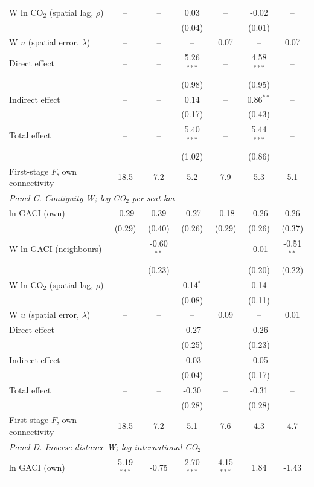 \documentclass[12pt]{article}
\begin{document}
\begin{table}[H]
{\begin{threeparttable}
\begin{tabular}{lcccccc}
  W ln CO$_2$ (spatial lag, $\rho$) & -- & -- & 0.03 & -- & -0.02 & -- \\
   &  &  & (0.04) &  & (0.01) &  \\
  W $u$ (spatial error, $\lambda$) & -- & -- & -- & 0.07 & -- & 0.07 \\
  Direct effect & -- & -- & 5.26$^{***}$ & -- & 4.58$^{***}$ & -- \\
   &  &  & (0.98) &  & (0.95) &  \\
  Indirect effect & -- & -- & 0.14 & -- & 0.86$^{**}$ & -- \\
   &  &  & (0.17) &  & (0.43) &  \\
  Total effect & -- & -- & 5.40$^{***}$ & -- & 5.44$^{***}$ & -- \\
   &  &  & (1.02) &  & (0.86) &  \\
  First-stage $F$, own connectivity & 18.5 & 7.2 & 5.2 & 7.9 & 5.3 & 5.1 \\
\midrule
\multicolumn{7}{l}{\textit{Panel C. Contiguity W; log CO$_2$ per seat-km}} \\
  ln GACI (own) & -0.29 & 0.39 & -0.27 & -0.18 & -0.26 & 0.26 \\
   & (0.29) & (0.40) & (0.26) & (0.29) & (0.26) & (0.37) \\
  W ln GACI (neighbours) & -- & -0.60$^{**}$ & -- & -- & -0.01 & -0.51$^{**}$ \\
   &  & (0.23) &  &  & (0.20) & (0.22) \\
  W ln CO$_2$ (spatial lag, $\rho$) & -- & -- & 0.14$^{*}$ & -- & 0.14 & -- \\
   &  &  & (0.08) &  & (0.11) &  \\
  W $u$ (spatial error, $\lambda$) & -- & -- & -- & 0.09 & -- & 0.01 \\
  Direct effect & -- & -- & -0.27 & -- & -0.26 & -- \\
   &  &  & (0.25) &  & (0.23) &  \\
  Indirect effect & -- & -- & -0.03 & -- & -0.05 & -- \\
   &  &  & (0.04) &  & (0.17) &  \\
  Total effect & -- & -- & -0.30 & -- & -0.31 & -- \\
   &  &  & (0.28) &  & (0.28) &  \\
  First-stage $F$, own connectivity & 18.5 & 7.2 & 5.1 & 7.6 & 4.3 & 4.7 \\
\midrule
\multicolumn{7}{l}{\textit{Panel D. Inverse-distance W; log international CO$_2$}} \\
  ln GACI (own) & 5.19$^{***}$ & -0.75 & 2.70$^{***}$ & 4.15$^{***}$ & 1.84 & -1.43 \\

\end{tabular}
\end{threeparttable}}
\end{table}
\end{document}
